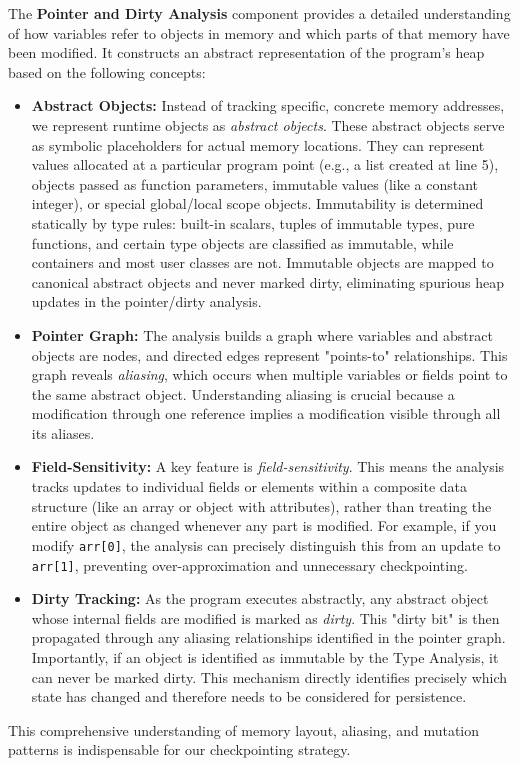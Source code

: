 The \textbf{Pointer and Dirty Analysis} component provides a detailed understanding of how variables refer to objects in memory and which parts of that memory have been modified. It constructs an abstract representation of the program's heap based on the following concepts:

\begin{itemize}
    \item \textbf{Abstract Objects:} Instead of tracking specific, concrete memory addresses, we represent runtime objects as \emph{abstract objects}. These abstract objects serve as symbolic placeholders for actual memory locations. They can represent values allocated at a particular program point (e.g., a list created at line 5), objects passed as function parameters, immutable values (like a constant integer), or special global/local scope objects. Immutability is determined statically by type rules: built-in scalars, tuples of immutable types, pure functions, and certain type objects are classified as immutable, while containers and most user classes are not. Immutable objects are mapped to canonical abstract objects and never marked dirty, eliminating spurious heap updates in the pointer/dirty analysis.
    \item \textbf{Pointer Graph:} The analysis builds a graph where variables and abstract objects are nodes, and directed edges represent "points-to" relationships. This graph reveals \emph{aliasing}, which occurs when multiple variables or fields point to the same abstract object. Understanding aliasing is crucial because a modification through one reference implies a modification visible through all its aliases.
    \item \textbf{Field-Sensitivity:} A key feature is \emph{field-sensitivity}. This means the analysis tracks updates to individual fields or elements within a composite data structure (like an array or object with attributes), rather than treating the entire object as changed whenever any part is modified. For example, if you modify \texttt{arr[0]}, the analysis can precisely distinguish this from an update to \texttt{arr[1]}, preventing over-approximation and unnecessary checkpointing.
    \item \textbf{Dirty Tracking:} As the program executes abstractly, any abstract object whose internal fields are modified is marked as \emph{dirty}. This "dirty bit" is then propagated through any aliasing relationships identified in the pointer graph. Importantly, if an object is identified as immutable by the Type Analysis, it can never be marked dirty. This mechanism directly identifies precisely which state has changed and therefore needs to be considered for persistence.
\end{itemize}
This comprehensive understanding of memory layout, aliasing, and mutation patterns is indispensable for our checkpointing strategy.

